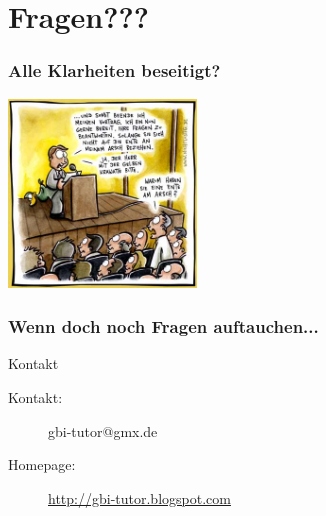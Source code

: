 \section[???]{Fragen???}
\begin{frame}
		\frametitle{Alle Klarheiten beseitigt?}
		\begin{center}
			\includegraphics[height=5cm]{comics/Fragen.jpg}\\
		\end{center}
\end{frame}

\begin{frame}
	\frametitle{Wenn doch noch Fragen auftauchen...}
	        \begin{block}{Kontakt}
                \begin{description}
                        \item[Kontakt:] gbi-tutor@gmx.de
                        \item[Homepage:] \url{http://gbi-tutor.blogspot.com}
                \end{description}
        \end{block}
\end{frame}


